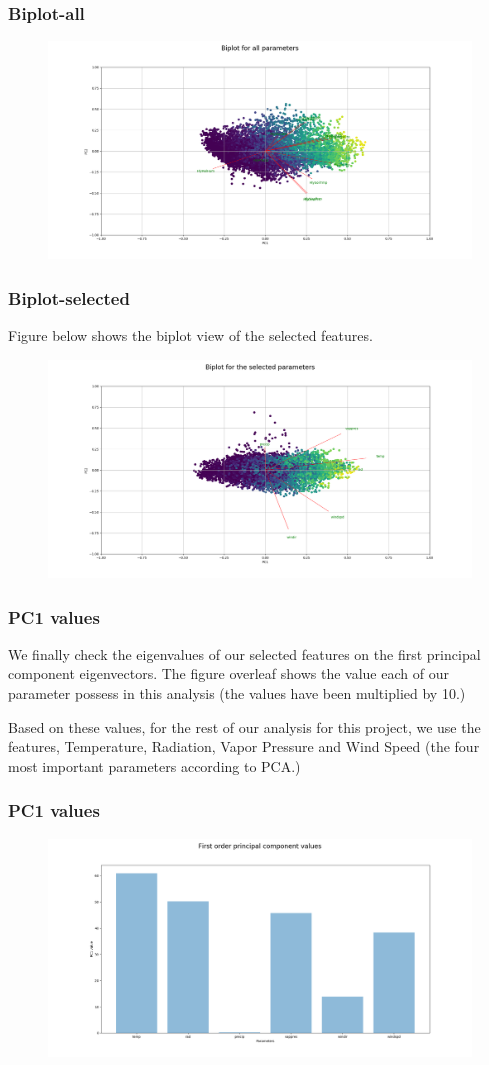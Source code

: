 \begin{frame}
\frametitle{Biplot-all}
\begin{figure}
	\includegraphics[width=1\textwidth]{images/biplot_full.png}
\end{figure}
\end{frame}


\begin{frame}
\frametitle{Biplot-selected}
Figure below shows the biplot view of the selected features.
\begin{figure}
	\includegraphics[width=1\textwidth]{images/biplot_selected.png}
\end{figure}
\end{frame}

\begin{frame}
\frametitle{PC1 values}
We finally check the eigenvalues of our selected features on the first principal component eigenvectors. The figure overleaf shows the value each of our parameter possess in this analysis (the values have been multiplied by 10.)

Based on these values, for the rest of our analysis for this project, we use the features, Temperature, Radiation, Vapor Pressure and Wind Speed (the four most important parameters according to PCA.)
\end{frame}


\begin{frame}
\frametitle{PC1 values}
\begin{figure}
	\includegraphics[width=1\textwidth]{images/PC1_values.png}
\end{figure}
\end{frame}